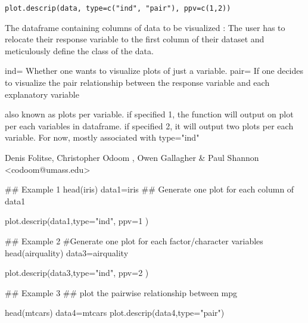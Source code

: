 \documentclass[a4paper]{book}
\begin{document}
%
\begin{Usage}
\begin{verbatim}
plot.descrip(data, type=c("ind", "pair"), ppv=c(1,2))
\end{verbatim}
\end{Usage}
%
\begin{Arguments}
\begin{ldescription}
\item[\code{data:}] The dataframe containing columns of data to be visualized
: The user has to relocate their response variable to the first column of their dataset and meticulously define the class of the data.

\item[\code{type:}] ind= Whether one wants to visualize plots of just a variable.\bsl{}
pair= If one decides to visualize the pair relationship between the response variable and each explanatory variable

\item[\code{ppv:}]  also known as plots per variable. if specified 1, the function will output on plot per each variables in dataframe.
if specified 2, it will output two plots per each variable. For now, mostly associated with type="ind"

\end{ldescription}
\end{Arguments}
%
\begin{Author}
Denis Folitse, Christopher Odoom , Owen Gallagher \& Paul Shannon <codoom@umass.edu>
\end{Author}
%
\begin{Examples}
\begin{ExampleCode}

## Example 1
head(iris)
data1=iris
## Generate one plot for each column of data1

plot.descrip(data1,type="ind", ppv=1 )



## Example 2
#Generate one plot for each factor/character variables
head(airquality)
data3=airquality

plot.descrip(data3,type="ind", ppv=2 )

## Example 3
## plot the pairwise relationship between mpg

head(mtcars)
data4=mtcars
plot.descrip(data4,type="pair")

\end{ExampleCode}
\end{Examples}
\printindex{}
\end{document}
